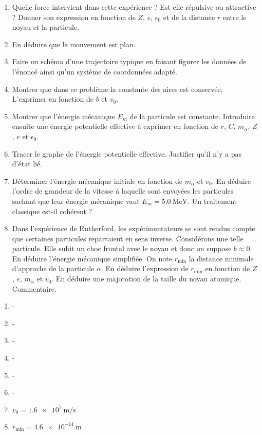 \begin{enumerate}
	\item Quelle force intervient dans cette expérience ? Est-elle répulsive ou attractive ? Donner son expression en fonction de $Z$, $e$, $\epsilon_0$ et de la distance $r$ entre le noyau et la particule. 
	
	\item En déduire que le mouvement est plan.
	
	\item Faire un schéma d'une trajectoire typique en faisant figurer les données de l'énoncé ainsi qu'un système de coordonnées adapté.
	
	\item Montrer que dans ce problème la constante des aires est conservée. L'exprimer en fonction de $b$ et $v_0$.
	
	\item Montrer que l'énergie mécanique $E_m$ de la particule est constante. Introduire ensuite une énergie potentielle effective à exprimer en fonction de $r$, $C$, $m_\alpha$, $Z$, $e$ et $\epsilon_0$. 
	
	\item Tracer le graphe de l'énergie potentielle effective. Justifier qu'il n'y a pas d'état lié.
	
	\item Déterminer l'énergie mécanique initiale en fonction de $m_\alpha$ et $v_0$. En déduire l'ordre de grandeur de la vitesse à laquelle sont envoyées les particules sachant que leur énergie mécanique vaut $E_m = \SI{5.0}{\mega\electronvolt}$. Un traitement classique est-il cohérent ?
	
	\item Dans l'expérience de Rutherford, les expérimentateurs se sont rendus compte que certaines particules repartaient en sens inverse. Considérons une telle particule. Elle subit un choc frontal avec le noyau et donc on suppose $b \approx 0$. En déduire l'énergie mécanique simplifiée. On note $r_\textrm{min}$ la distance minimale d'approche de la particule $\alpha$. En déduire l'expression de $r_{\min}$ en fonction de $Z$, $e$, $m_\alpha$ et $v_0$. En déduire une majoration de la taille du noyau atomique. Commentaire.
\end{enumerate}

\begin{enumerate}
	\item - 
	\item - 
	\item -
	\item - 
	\item -
	\item - 
	\item $v_0 = \SI{1.6e7}{\meter\per\second}$
	\item $r_\textrm{min} = \SI{4.6e-14}{\meter}$
\end{enumerate}

